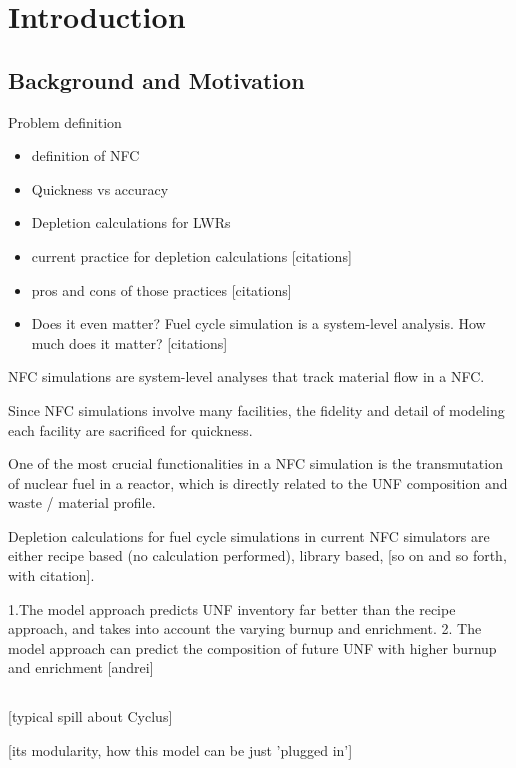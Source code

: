 \section{Introduction}
\subsection{Background and Motivation}
Problem definition

\begin{itemize}
    \item definition of NFC
    \item Quickness vs accuracy
    \item Depletion calculations for LWRs
    \item current practice for depletion calculations [citations]
    \item pros and cons of those practices [citations]
    \item Does it even matter? Fuel cycle simulation is a system-level analysis. How much does it matter? [citations]
\end{itemize}


\gls{NFC} simulations are system-level analyses that track
material flow in a \gls{NFC}. 

Since \gls{NFC} simulations
involve many facilities, the fidelity and detail of modeling each
facility are sacrificed for quickness. 

One of the most crucial functionalities in a \gls{NFC}
simulation is the transmutation of nuclear fuel in a reactor,
which is directly related to the \gls{UNF} composition
and waste / material profile.

Depletion calculations for fuel cycle simulations in current
\gls{NFC} simulators are either
recipe based (no calculation performed), 
library based, [so on and so forth, with citation].



1.The model approach predicts \gls{UNF} inventory far better than
the recipe approach, and takes into account the varying burnup and
enrichment.
2. The model approach can predict the composition of future
\gls{UNF} with higher burnup and enrichment [andrei]

\subsection{\Cyclus}
[typical spill about Cyclus]

[its modularity, how this model can be just 'plugged in']




